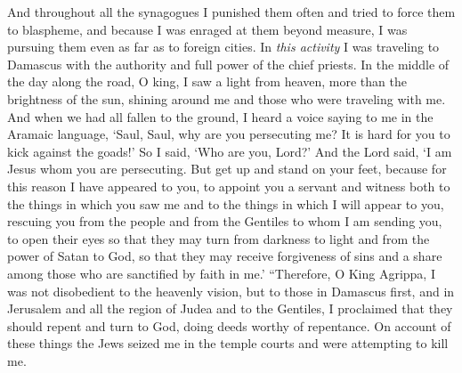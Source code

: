 \begin{biblechapter}
\verse And throughout all the synagogues I punished them often and tried to force them to blaspheme, and because I was enraged at them beyond measure, I was pursuing them even as far as to foreign cities.
\verse In \textit{this activity} I was traveling to Damascus with the authority and full power of the chief priests.
\verse In the middle of the day along the road, O king, I saw a light from heaven, more than the brightness of the sun, shining around me and those who were traveling with me.
\verse And when we had all fallen to the ground, I heard a voice saying to me in the Aramaic language, ‘Saul, Saul, why are you persecuting me? It is hard for you to kick against the goads!’
\verse So I said, ‘Who are you, Lord?’ And the Lord said, ‘I am Jesus whom you are persecuting.
\verse But get up and stand on your feet, because for this reason I have appeared to you, to appoint you a servant and witness both to the things in which you saw me and to the things in which I will appear to you,
\verse rescuing you from the people and from the Gentiles to whom I am sending you,
\verse to open their eyes so that they may turn from darkness to light and from the power of Satan to God, so that they may receive forgiveness of sins and a share among those who are sanctified by faith in me.’
\verse “Therefore, O King Agrippa, I was not disobedient to the heavenly vision,
\verse but to those in Damascus first, and in Jerusalem and all the region of Judea and to the Gentiles, I proclaimed that they should repent and turn to God, doing deeds worthy of repentance.
\verse On account of these things the Jews seized me in the temple courts and were attempting to kill me.

\end{biblechapter}
